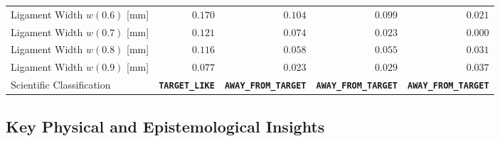 \begin{table}[htbp]
\begin{tabular}{lrrrr}
Ligament Width $w(0.6)$ [mm] & $0.170$ & $0.104$ & $0.099$ & $0.021$ \\
Ligament Width $w(0.7)$ [mm] & $0.121$ & $0.074$ & $0.023$ & $0.000$ \\
Ligament Width $w(0.8)$ [mm] & $0.116$ & $0.058$ & $0.055$ & $0.031$ \\
Ligament Width $w(0.9)$ [mm] & $0.077$ & $0.023$ & $0.029$ & $0.037$ \\
Scientific Classification & \textbf{\texttt{TARGET\_LIKE}} & \textbf{\texttt{AWAY\_FROM\_TARGET}} & \textbf{\texttt{AWAY\_FROM\_TARGET}} & \textbf{\texttt{AWAY\_FROM\_TARGET}} \\
\bottomrule
\end{tabular}
\end{table}

\subsection{Key Physical and Epistemological Insights}
